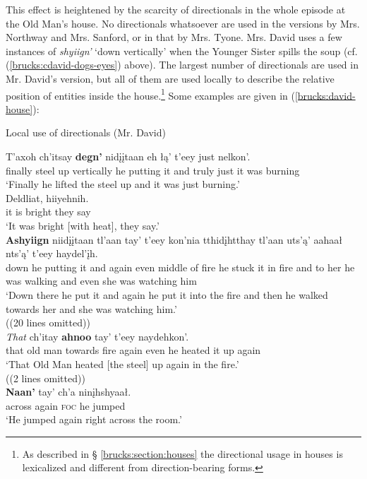 This effect is heightened by the scarcity of directionals in the whole episode at the Old Man's house. No directionals whatsoever are used in the versions by Mrs. Northway and Mrs. Sanford, or in that by Mrs. Tyone. Mrs. David uses a few instances of \textit{shyiign'} `down vertically' when the Younger Sister spills the soup (cf. (\ref{brucks:cdavid-dogs-eyes}) above). The largest number of directionals are used in Mr. David's version, but all of them are used locally to describe the relative position of entities inside the house.\footnote{As described in § \ref{brucks:section:houses} the directional usage in houses is lexicalized and different from direction-bearing forms.} Some examples are given in (\ref{brucks:david-house}):

\begin{exe}
\ex Local use of directionals (Mr. David) \label{brucks:david-house}
\begin{xlist}

\ex \gll T'axoh ch'itsay \textbf{degn'} nidįįtaan eh łą' t'eey just nelkon'.  \\
 finally steel {up vertically} {he putting it} and truly just {it was burning} \\
\glt `Finally he lifted the steel up and it was just burning.' \\

\ex \gll Deldliat, hiiyehnih.  \\
 {it is bright} {they say} \\
\glt `It was bright [with heat], they say.' \\

\ex \gll \textbf{Ashyiign} niidįįtaan tl'aan tay' t'eey kon'nia tthidįhtthay tl'aan uts'ą' aahaał nts'ą' t'eey haydel'įh.  \\
 down {he putting it} and again even {middle of fire} {he stuck it in fire} and {to her} {he was walking} and even {she was watching him} \\
\glt `Down there he put it and again he put it into the fire and then he walked towards her and she was watching him.' \\

\sn  ((20 lines omitted))\\

\ex \gll \textit{That} ch'itay \textbf{ahnoo} tay' t'eey naydehkon'.  \\
 that {old man} {towards fire} again even {he heated it up again} \\
\glt `That Old Man heated [the steel] up again in the fire.' \\

\sn ((2 lines omitted)) \\

\ex \gll \textbf{Naan'} tay' ch'a ninįhshyaał.  \\
 across again \textsc{foc} {he jumped} \\
\glt `He jumped again right across the room.' \\
\end{xlist}
\end{exe}

